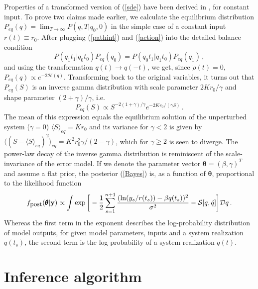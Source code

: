 \documentclass[11pt]{article}
\newcommand{\vc}[1]{{\bf #1 }}
\theoremstyle{definition}
\newcommand{\bt}{\pmb\theta}
\begin{document}
Properties of a transformed version of (\ref{sde}) have been derived in \cite{dutre_1977_SDE, schenzle_1979_multStochProc, fujisaka_1986_intermittency}, for constant input.
To prove two claims made earlier, we calculate the equilibrium distribution $P_{eq}(q) = \lim_{T\rightarrow\infty} P(q,T|q_0,0)$ in the simple case of a constant input $r(t)\equiv r_{0}$. After plugging (\ref{pathint}) and (\ref{action}) into the detailed balance condition
\begin{equation}\label{detailed_balance}
P(q_1 t_1 | q_0 t_0 ) P_{eq}(q_0) = P(q_0 t_1 | q_1 t_0 ) P_{eq}(q_1) \,,
\end{equation}
and using the transformation $q(t) \rightarrow q(-t)$, we get, since $\dot\rho(t)= 0$,
$P_{eq}(q)
  \propto
  e^{-2\mathcal{H}(q)}$.
Transforming back to the original variables, it turns out that $P_{eq}(S)$ is an inverse gamma distribution with scale parameter $2Kr_{0}/\gamma$ and shape parameter $(2+\gamma)/\gamma$, i.e.
\begin{equation}\label{inverse_gamma}
  P_{eq}(S)
  \propto
  S^{-2(1+\gamma)/\gamma}e^{-2Kr_{0}/(\gamma S)}\,.
\end{equation}
The mean of this expression equals the equilibrium solution of the unperturbed system ($\gamma=0$)
$\langle S\rangle_{eq}=Kr_{0}$
and its variance for $\gamma< 2$ is given by $ \langle (S - \langle S\rangle_{eq})^2\rangle_{eq}
  =
  K^2r_{0}^2
  \gamma/(2-\gamma)$, which for $\gamma\geq 2$ is seen to diverge.
The power-law decay of the inverse gamma distribution is reminiscent of the scale-invariance of the error model. If we denote the parameter vector $\bt=(\beta,\gamma)^T$ and assume a flat prior, the posterior (\ref{Bayes}) is, as a function of $\bt$, proportional to the likelihood function
\begin{equation}\label{posterior_pathint}
  f_{\mbox{\small post}}(\bt | \vc y)
  \propto
  \int
  \exp\bigg[
    -\frac{1}{2}
    \sum_{s=1}^{n+1}
    \frac
    {(\ln(y_s/r(t_s))-{\beta q(t_s)})^2}
    {\sigma^2} -{{\mathcal S}}[{q},\dot q]
  \bigg]
  {\mathcal Dq}
  \,.
\end{equation}
Whereas the first term in the exponent describes the log-probability distribution of model outputs, for given model parameters, inputs and a system realization $q(t_s)$, the second term is the log-probability of a system realization $q(t)$.



\section{Inference algorithm}
\end{document}
